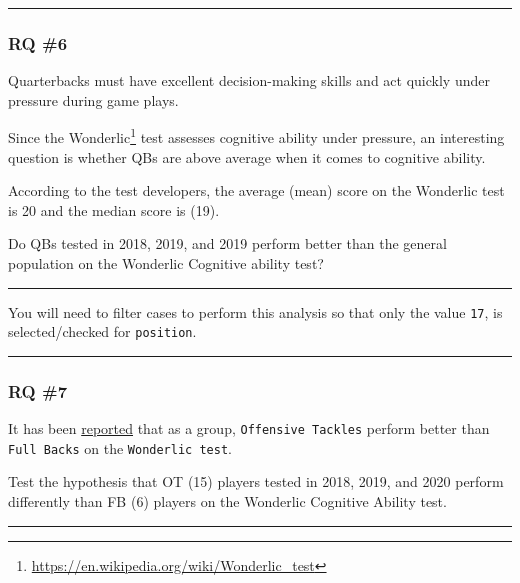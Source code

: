 \documentclass[
]{article}
\begin{document}
\begin{center}\rule{0.5\linewidth}{0.5pt}\end{center}

\hypertarget{rq-6}{%
\subsubsection{RQ \#6}\label{rq-6}}

Quarterbacks must have excellent decision-making skills and act quickly under pressure during game plays.

Since the Wonderlic\footnote{\url{https://en.wikipedia.org/wiki/Wonderlic_test}} test assesses cognitive ability under pressure, an interesting question is whether QBs are above average when it comes to cognitive ability.

According to the test developers, the average (mean) score on the Wonderlic test is 20 and the median score is (19).

Do QBs tested in 2018, 2019, and 2019 perform better than the general population on the Wonderlic Cognitive ability test?

\begin{center}\rule{0.5\linewidth}{0.5pt}\end{center}

You will need to filter cases to perform this analysis so that only the value \texttt{17}, is selected/checked for \texttt{position}.

\begin{center}\rule{0.5\linewidth}{0.5pt}\end{center}

\hypertarget{rq-7}{%
\subsubsection{RQ \#7}\label{rq-7}}

It has been \href{https://www.cbssports.com/nfl/news/nfl-draft-combine-the-highest-and-lowest-wonderlic-test-scores-ever-recorded/}{reported} that as a group, \texttt{Offensive\ Tackles} perform better than \texttt{Full\ Backs} on the \texttt{Wonderlic\ test}.

Test the hypothesis that OT (15) players tested in 2018, 2019, and 2020 perform differently than FB (6) players on the Wonderlic Cognitive Ability test.

\begin{center}\rule{0.5\linewidth}{0.5pt}\end{center}
\end{document}
